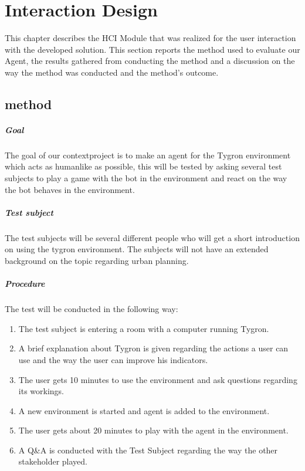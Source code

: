 \chapter{Interaction Design}
This chapter describes the HCI Module that was realized for the user interaction with the developed solution. This section reports the method used to evaluate our Agent, the results gathered from conducting the method and a discussion on the way the method was conducted and the method's outcome.

\section*{method}

\paragraph{Goal}

The goal of our contextproject is to make an agent for the Tygron environment which acts as humanlike as possible, this will be tested by asking several test subjects to play a game with the bot in the environment and react on the way the bot behaves in the environment.

\paragraph{Test subject}

The test subjects will be several different people who will get a short introduction on using the tygron environment. The subjects will not have an extended background on the topic regarding urban planning.

\paragraph{Procedure}

The test will be conducted in the following way: 
\begin{enumerate}
\item The test subject is entering a room with a computer running Tygron.
\item A brief explanation about Tygron is given regarding the actions a user can use and the way the user can improve his indicators.
\item The user gets 10 minutes to use the environment and ask questions regarding its workings. 
\item A new environment is started and agent is added to the environment.
\item The user gets about 20 minutes to play with the agent in the environment.
\item A Q\&A is conducted with the Test Subject regarding the way the other stakeholder played.
\end{enumerate}

